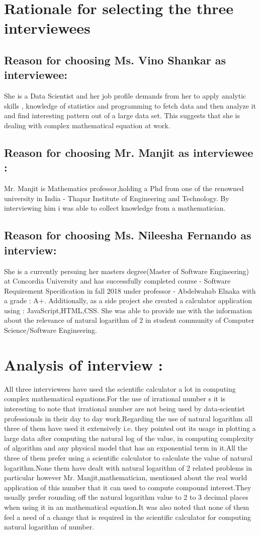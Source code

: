 \documentclass{article}
\begin{document}
\section{Rationale for selecting the three interviewees} 
\subsection{Reason for choosing Ms. Vino Shankar as interviewee:}
She is a Data Scientist and her job profile demands from her to apply  analytic skills , knowledge of statistics and programming to fetch data and then analyze it and find interesting pattern out of a large data set. 
This suggests that she is dealing with complex mathematical equation at work.
\subsection{Reason for choosing Mr. Manjit as interviewee :}
Mr. Manjit is Mathematics professor,holding a Phd from one of the renowned university in India - Thapar Institute of Engineering and Technology.
By interviewing him i was able to collect knowledge from a mathematician.

\subsection{Reason for choosing Ms. Nileesha Fernando as interview:}
She is a currently persuing her masters degree(Master of Software Engineering) at Concordia University and has successfully completed course - Software Requirement Specification in fall 2018 under professor - Abdelwahab Elnaka with a grade : A+. Additionally, as a side project she created a calculator application using : JavaScript,HTML,CSS.
She was able to provide me with the information about the relevance of natural logarithm of 2 in student community of Computer Science/Software Engineering.

\section{Analysis of interview :}
All three interviewees have used the scientific calculator a lot in computing complex mathematical equations.For the use of irrational number s it is interesting to note that irrational number are not being used by  data-scientist professionals in their day to day work.Regarding the use of natural logarithm all three of them have used it extensively i.e. they pointed out its usage in plotting a large data after computing the natural log of the value, in computing complexity of algorithm and any physical model that has an exponential term in it.All the three of them prefer using a scientific calculator to calculate the value of natural logarithm.None them have dealt with natural logarithm of 2 related problems in particular however Mr. Manjit,mathematician, mentioned about the real world application of this number that it can used to compute compound interest.They usually prefer rounding off the natural logarithm value to 2 to 3 decimal places when using it in an mathematical equation.It was also noted that none of them feel a need of a change that is required in the scientific calculator for computing natural logarithm of number.
\end{document}
